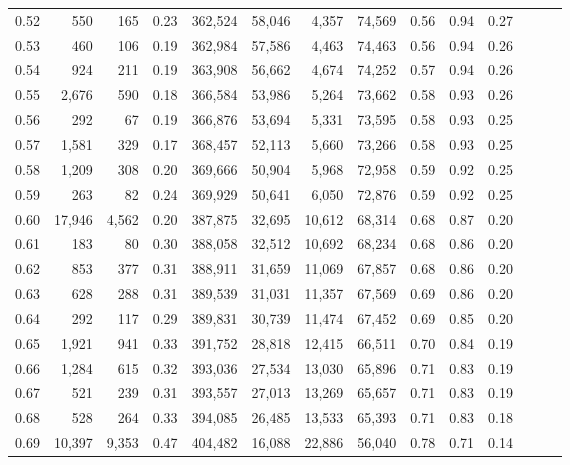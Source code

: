 \begin{tabular}{rrrrrrrrrrrrrr}
0.52 &     550 &     165 &  0.23 &  362,524 &   58,046 &   4,357 &  74,569 &  0.56 &  0.94 &      0.27 \\
0.53 &     460 &     106 &  0.19 &  362,984 &   57,586 &   4,463 &  74,463 &  0.56 &  0.94 &      0.26 \\
0.54 &     924 &     211 &  0.19 &  363,908 &   56,662 &   4,674 &  74,252 &  0.57 &  0.94 &      0.26 \\
0.55 &   2,676 &     590 &  0.18 &  366,584 &   53,986 &   5,264 &  73,662 &  0.58 &  0.93 &      0.26 \\
0.56 &     292 &      67 &  0.19 &  366,876 &   53,694 &   5,331 &  73,595 &  0.58 &  0.93 &      0.25 \\
0.57 &   1,581 &     329 &  0.17 &  368,457 &   52,113 &   5,660 &  73,266 &  0.58 &  0.93 &      0.25 \\
0.58 &   1,209 &     308 &  0.20 &  369,666 &   50,904 &   5,968 &  72,958 &  0.59 &  0.92 &      0.25 \\
0.59 &     263 &      82 &  0.24 &  369,929 &   50,641 &   6,050 &  72,876 &  0.59 &  0.92 &      0.25 \\
0.60 &  17,946 &   4,562 &  0.20 &  387,875 &   32,695 &  10,612 &  68,314 &  0.68 &  0.87 &      0.20 \\
0.61 &     183 &      80 &  0.30 &  388,058 &   32,512 &  10,692 &  68,234 &  0.68 &  0.86 &      0.20 \\
0.62 &     853 &     377 &  0.31 &  388,911 &   31,659 &  11,069 &  67,857 &  0.68 &  0.86 &      0.20 \\
0.63 &     628 &     288 &  0.31 &  389,539 &   31,031 &  11,357 &  67,569 &  0.69 &  0.86 &      0.20 \\
0.64 &     292 &     117 &  0.29 &  389,831 &   30,739 &  11,474 &  67,452 &  0.69 &  0.85 &      0.20 \\
0.65 &   1,921 &     941 &  0.33 &  391,752 &   28,818 &  12,415 &  66,511 &  0.70 &  0.84 &      0.19 \\
0.66 &   1,284 &     615 &  0.32 &  393,036 &   27,534 &  13,030 &  65,896 &  0.71 &  0.83 &      0.19 \\
0.67 &     521 &     239 &  0.31 &  393,557 &   27,013 &  13,269 &  65,657 &  0.71 &  0.83 &      0.19 \\
0.68 &     528 &     264 &  0.33 &  394,085 &   26,485 &  13,533 &  65,393 &  0.71 &  0.83 &      0.18 \\
0.69 &  10,397 &   9,353 &  0.47 &  404,482 &   16,088 &  22,886 &  56,040 &  0.78 &  0.71 &      0.14 \\

\end{tabular}
